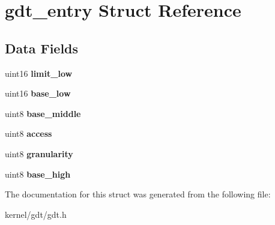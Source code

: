 \hypertarget{structgdt__entry}{
\section{gdt\_\-entry Struct Reference}
\label{structgdt__entry}
}
\subsection*{Data Fields}
\begin{DoxyCompactItemize}
\item 
\hypertarget{structgdt__entry_a3c761cdac295f8aad302ee99d57d79de}{
uint16 {\bfseries limit\_\-low}}
\label{structgdt__entry_a3c761cdac295f8aad302ee99d57d79de}

\item 
\hypertarget{structgdt__entry_a4c2e89e06ecbce318f171fd77f685b3a}{
uint16 {\bfseries base\_\-low}}
\label{structgdt__entry_a4c2e89e06ecbce318f171fd77f685b3a}

\item 
\hypertarget{structgdt__entry_a34f487f4e3adf7fbe06a2314fc37c6d2}{
uint8 {\bfseries base\_\-middle}}
\label{structgdt__entry_a34f487f4e3adf7fbe06a2314fc37c6d2}

\item 
\hypertarget{structgdt__entry_ae2e768f9f6767c14042e0ead020f1e95}{
uint8 {\bfseries access}}
\label{structgdt__entry_ae2e768f9f6767c14042e0ead020f1e95}

\item 
\hypertarget{structgdt__entry_a64b2d8577a2d5c2aa168d1fd956cb2c7}{
uint8 {\bfseries granularity}}
\label{structgdt__entry_a64b2d8577a2d5c2aa168d1fd956cb2c7}

\item 
\hypertarget{structgdt__entry_aede8e4e0a03cd119e2f36f9fc97d48ad}{
uint8 {\bfseries base\_\-high}}
\label{structgdt__entry_aede8e4e0a03cd119e2f36f9fc97d48ad}

\end{DoxyCompactItemize}


The documentation for this struct was generated from the following file:\begin{DoxyCompactItemize}
\item 
kernel/gdt/gdt.h\end{DoxyCompactItemize}
